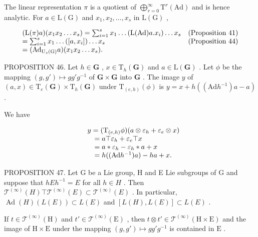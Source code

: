 The linear representation \(\pi\) is a quotient of \(\bigoplus_{r=0}^{\infty} \mathrm{T}^{r}(\mathrm{Ad})\) and is hence analytic. For \(a \in \mathrm{L}(\mathrm{G})\) and \(x_{1}, x_{2}, \ldots, x_{s}\) in \(\mathrm{L}(\mathrm{G})\) ,

\[
\begin{array}{l l} (\mathrm{L} (\pi) a) (x _ {1} x _ {2} \dots x _ {s}) = \sum_ {i = 1} ^ {s} x _ {1} \dots (\mathrm{L} (\mathrm{Ad}) a. x _ {i}) \dots x _ {s} & \text {(Proposition 41)} \\ = \sum_ {i = 1} ^ {s} x _ {1} \dots ([ a, x _ {i} ]) \dots x _ {s} & \text {(Proposition 44)} \\ = (\mathrm{Ad} _ {\mathrm{U} _ {s} (\mathrm{G})} a) (x _ {1} x _ {2} \dots x _ {s}). \end{array}
\]

PROPOSITION 46. Let \(h \in \mathbf{G}\) , \(x \in \mathrm{T}_h(\mathbf{G})\) and \(a \in \mathrm{L}(\mathbf{G})\) . Let \(\phi\) be the mapping \((g, g') \mapsto gg'g^{-1}\) of \(\mathbf{G} \times \mathbf{G}\) into \(\mathbf{G}\) . The image \(y\) of \((a, x) \in \mathrm{T}_e(\mathbf{G}) \times \mathrm{T}_h(\mathbf{G})\) under \(\mathrm{T}_{(e,h)}(\phi)\) is \(y = x + h((\mathrm{Ad}h^{-1})a - a)\) .

We have

\[
\begin{array}{r l} & y = (\mathrm{T} _ {(e, h)} \phi) (a \otimes \varepsilon_ {h} + \varepsilon_ {e} \otimes x) \\ & \quad = a \top \varepsilon_ {h} + \varepsilon_ {e} \top x \\ & \quad = a * \varepsilon_ {h} - \varepsilon_ {h} * a + x \\ & \quad = h ((\mathrm{Ad} h ^ {- 1}) a) - h a + x. \end{array}
\]

PROPOSITION 47. Let G be a Lie group, H and E Lie subgroups of G and suppose that \(hEh^{-1} = E\) for all \(h \in H\) . Then \(\mathcal{T}^{(\infty)}(H) \top \mathcal{T}^{(\infty)}(E) \subset \mathcal{T}^{(\infty)}(E)\) . In particular, \(\operatorname{Ad}(H)(L(E)) \subset L(E)\) and \([L(H), L(E)] \subset L(E)\) .

If \(t \in \mathcal{T}^{(\infty)}(\mathrm{H})\) and \(t' \in \mathcal{T}^{(\infty)}(\mathrm{E})\) , then \(t \otimes t' \in \mathcal{T}^{(\infty)}(\mathrm{H} \times \mathrm{E})\) and the image of \(\mathrm{H} \times \mathrm{E}\) under the mapping \((g, g') \mapsto gg'g^{-1}\) is contained in \(\mathrm{E}\) .

